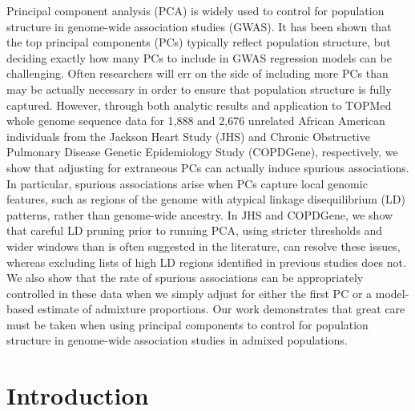 \documentclass[12pt]{article}
\begin{document}
Principal component analysis (PCA) is widely used to control for population structure in genome-wide association studies (GWAS). It has been shown that the top principal components (PCs) typically reflect population structure, but deciding exactly how many PCs to include in GWAS regression models can be challenging. Often researchers will err on the side of including more PCs than may be actually necessary in order to ensure that population structure is fully captured. However, through both analytic results and application to TOPMed whole genome sequence data for 1,888 and 2,676 unrelated African American individuals from the Jackson Heart Study (JHS) and Chronic Obstructive Pulmonary Disease Genetic Epidemiology Study (COPDGene), respectively, we show that adjusting for extraneous PCs can actually induce spurious associations. In particular, spurious associations arise when PCs capture local genomic features, such as regions of the genome with atypical linkage disequilibrium (LD) patterns, rather than genome-wide ancestry. In JHS and COPDGene, we show that careful LD pruning prior to running PCA, using stricter thresholds and wider windows than is often suggested in the literature, can resolve these issues, whereas excluding lists of high LD regions identified in previous studies does not. We also show that the rate of spurious associations can be appropriately controlled in these data when we simply adjust for either the first PC or a model-based estimate of admixture proportions. Our work demonstrates that great care must be taken when using principal components to control for population structure in genome-wide association studies in admixed populations.


\newpage
\section{Introduction}

\end{document}
